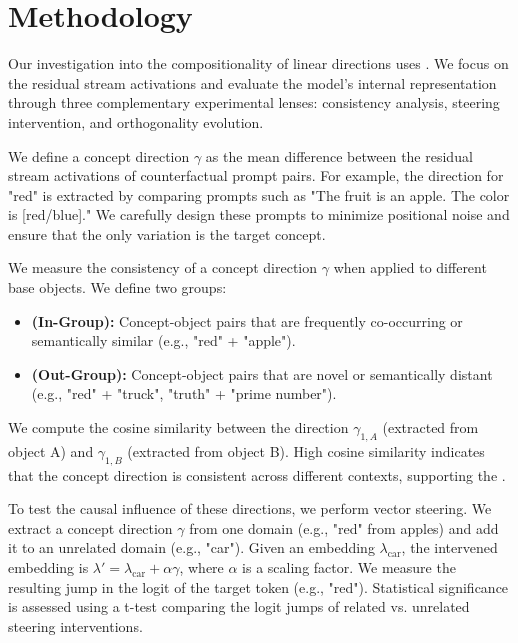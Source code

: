 \section{Methodology}
\label{sec:methodology}

Our investigation into the compositionality of linear directions uses \qwen \cite{qwen25}. We focus on the residual stream activations and evaluate the model's internal representation through three complementary experimental lenses: consistency analysis, steering intervention, and orthogonality evolution.

 We define a concept direction $\gamma$ as the mean difference between the residual stream activations of counterfactual prompt pairs. For example, the direction for "red" is extracted by comparing prompts such as "The fruit is an apple. The color is [red/blue]." We carefully design these prompts to minimize positional noise and ensure that the only variation is the target concept.

 We measure the consistency of a concept direction $\gamma$ when applied to different base objects. We define two groups:
\begin{itemize}[leftmargin=*,itemsep=0pt,topsep=0pt]
    \item \textbf{\related (In-Group):} Concept-object pairs that are frequently co-occurring or semantically similar (e.g., "red" + "apple").
    \item \textbf{\unrelated (Out-Group):} Concept-object pairs that are novel or semantically distant (e.g., "red" + "truck", "truth" + "prime number").
\end{itemize}
We compute the cosine similarity between the direction $\gamma_{1,A}$ (extracted from object A) and $\gamma_{1,B}$ (extracted from object B). High cosine similarity indicates that the concept direction is consistent across different contexts, supporting the \lrh.

 To test the causal influence of these directions, we perform vector steering. We extract a concept direction $\gamma$ from one domain (e.g., "red" from apples) and add it to an unrelated domain (e.g., "car"). Given an embedding $\lambda_{\text{car}}$, the intervened embedding is $\lambda' = \lambda_{\text{car}} + \alpha \gamma$, where $\alpha$ is a scaling factor. We measure the resulting jump in the logit of the target token (e.g., "red"). Statistical significance is assessed using a t-test comparing the logit jumps of related vs. unrelated steering interventions.

